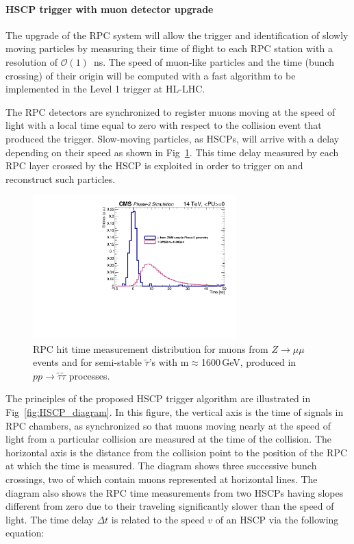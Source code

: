 \paragraph{HSCP trigger with muon detector upgrade}

The upgrade of the RPC system will allow the trigger and identification of slowly moving particles by measuring their time of flight to each RPC station with a resolution of $\mathcal{O}(1)$~ns. The speed of muon-like particles and the time (bunch crossing) of their origin will be computed with a fast algorithm to be implemented in the Level 1 trigger at HL-LHC. 

The RPC detectors are synchronized to register muons moving at the speed of light with a local time equal to zero with respect to the collision event that produced the trigger. Slow-moving particles, as HSCPs, will arrive with a delay depending on their speed as shown in Fig~\ref{fig:hscp_time}. This time delay measured by each RPC layer crossed by the HSCP is exploited in order to trigger on and reconstruct such particles. 

\begin{figure}[h!tbp]
\begin{center}
  \includegraphics[width=0.7\textwidth]{figures/HSCP/time.pdf}
  \caption{RPC hit time measurement distribution for muons from $Z \to \mu\mu$ events and 
  for semi-stable $\tilde \tau$'s with m$\approx$1600\,GeV, produced in $pp \to \tilde \tau \tilde \tau$ processes. }
  \label{fig:hscp_time}
\end{center}
\end{figure}

The principles of the proposed HSCP trigger algorithm are illustrated in Fig~\ref{fig:HSCP_diagram}. In this figure, the vertical axis is the time of signals in RPC chambers, as synchronized so that muons moving nearly at the speed of light from a particular collision are measured at the time of the collision. The horizontal axis is the distance from the collision point to the position of the RPC at which the time is measured. The diagram shows three successive bunch crossings, two of which contain muons represented at horizontal lines. The diagram also shows the RPC time measurements from two HSCPs having slopes different from zero due to their traveling significantly slower than the speed of light. 
The time delay $\Delta t$ is related to the speed $v$ of an HSCP via the following equation:

